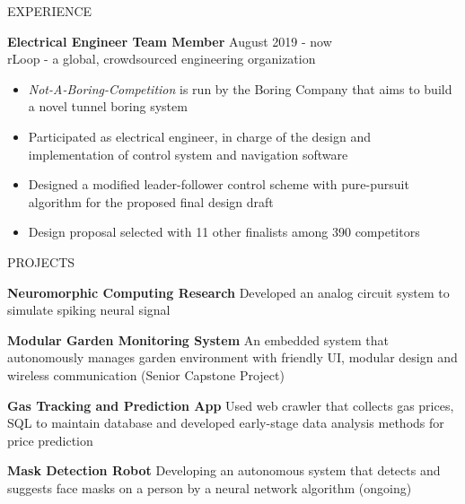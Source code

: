 \documentclass{resume} %
\begin{document}
\begin{rSection}{EXPERIENCE}
		
		\textbf{Electrical Engineer Team Member} \hfill August 2019 - now
		\\	rLoop - a global, crowdsourced engineering organization \hfill \textit{}
		\begin{itemize}
			\itemsep -4pt {} 
			\item \textit{Not-A-Boring-Competition} is run by the Boring Company that aims to build a novel tunnel boring system
			\item Participated as electrical engineer, in charge of the design and implementation of control system and navigation software
			\item Designed a modified leader-follower control scheme with pure-pursuit algorithm for the proposed final design draft
			\item Design proposal selected with 11 other finalists among 390 competitors
		\end{itemize}
		
			
		
	\end{rSection} 
	
	
	\begin{rSection}{PROJECTS}
		\vspace{-1em}
		
		\item \textbf{Neuromorphic Computing Research} {Developed an analog circuit system to simulate spiking neural signal}
		
		\item \textbf{Modular Garden Monitoring System} {An embedded system that autonomously manages garden environment with friendly UI, modular design and wireless communication (Senior Capstone Project)}
		
		\item \textbf{Gas Tracking and Prediction App} {Used web crawler that collects gas prices, SQL to maintain database and developed early-stage data analysis methods for price prediction}
		
		\item \textbf{Mask Detection Robot} {Developing an autonomous system that detects and suggests face masks on a person by a neural network algorithm (ongoing)}
		
		
	\end{rSection} 
	
\end{document}
